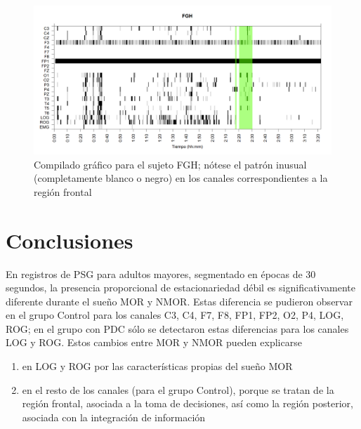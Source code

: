 \begin{figure}
\centering
\includegraphics[width=0.95\linewidth]
{./img_ejemplos/FGHSUE_est.png} 
\caption{Compilado gráfico para el sujeto FGH; nótese el patrón inusual (completamente 
blanco o negro) en los canales correspondientes a la región frontal}
\label{FGH_especial}
\end{figure}



\section{Conclusiones}

En registros de PSG para adultos mayores, segmentado en épocas de 30 segundos, la presencia 
proporcional de estacionariedad débil es significativamente diferente durante el sueño MOR y 
NMOR.
Estas diferencia se pudieron observar en el grupo Control para los canales C3, C4, F7, F8, FP1, 
FP2, O2, P4, LOG, ROG; en el grupo con PDC sólo se detectaron estas diferencias para los canales 
LOG y ROG.
Estos cambios entre MOR y NMOR pueden explicarse 
\begin{enumerate}
\item en LOG y ROG por las características propias  del sueño MOR
\item en el resto de los canales (para el grupo Control), porque se tratan de la 
región frontal, asociada a la toma de decisiones, así como la región posterior, 
asociada con la integración
de información
\end{enumerate}

